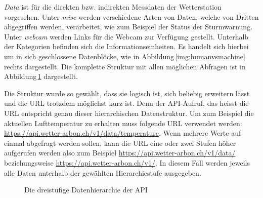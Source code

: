 \noindent
\emph{Data} ist für die direkten bzw. indirekten Messdaten der Wetterstation vorgesehen. Unter \emph{misc} werden verschiedene Arten von Daten, welche von Dritten abgegriffen werden, verarbeitet, wie zum Beispiel der Status der Sturmwarnung. Unter \emph{webcam} werden Links für die Webcam zur Verfügung gestellt. Unterhalb der Kategorien befinden sich die Informationseinheiten. Es handelt sich hierbei um in sich geschlossene Datenblöcke, wie in Abbildung\,\ref{img:humanvsmachine} rechts dargestellt. Die komplette Struktur mit allen möglichen Abfragen ist in Abbildung\,\ref{img:hierarchie} dargestellt.

Die Struktur wurde so gewählt, dass sie logisch ist, sich beliebig erweitern lässt und die URL trotzdem möglichst kurz ist. Denn der API-Aufruf, das heisst die URL entspricht genau dieser hierarchischen Datenstruktur. Um zum Beispiel die aktuellen Lufttemperatur zu erhalten muss folgende URL verwendet werden: \url{https://api.wetter-arbon.ch/v1/data/temperature}. Wenn mehrere Werte auf einmal abgefragt werden sollen, kann die URL eine oder zwei Stufen höher aufgerufen werden also zum Beispiel \url{https://api.wetter-arbon.ch/v1/data/} beziehungsweise \url{https://api.wetter-arbon.ch/v1/}. In diesem Fall werden jeweils alle Daten unterhalb der gewählten Hierarchiestufe ausgegeben.


\begin{figure}[htbp!]
	\centering
	\caption{Die dreistufige Datenhierarchie der API}
	\label{img:hierarchie}
\end{figure}




